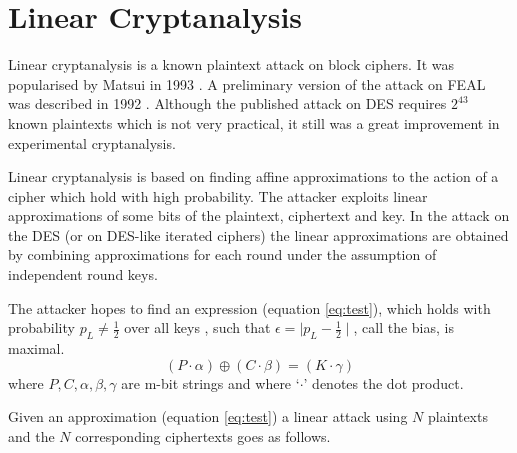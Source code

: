 \section{Linear Cryptanalysis}
Linear cryptanalysis is a known plaintext attack on block ciphers. It was popularised by Matsui in 1993 \cite{matsui1994linear}. A preliminary version of the attack on FEAL was described in 1992 \cite{matsui1993new}. Although the published attack on DES requires $2^{43}$ known plaintexts which is not very practical, it still was a great improvement in experimental cryptanalysis. 

Linear cryptanalysis is based on finding affine approximations to the action of a cipher which hold with high probability. The attacker exploits linear approximations of some bits of the plaintext, ciphertext and key. In the attack on the DES (or on DES-like iterated ciphers) the linear approximations are obtained by combining approximations for each round under the assumption of independent round keys. 

The attacker hopes to find an expression (equation \ref{eq:test}), which holds with probability $p_{L} \neq \frac{1}{2}$ over all keys \cite{matsui1994linear}, such that $\epsilon = \mid p_{L} - \frac{1}{2} \mid$, call the bias, is maximal. 
\begin{equation} \label{eq:test}
(P\cdot\alpha)\oplus(C\cdot\beta)=(K\cdot\gamma)
\end{equation}
where $P,C,\alpha,\beta,\gamma$ are m-bit strings and where `$\cdot$' denotes the dot product.

Given an approximation (equation \ref{eq:test}) a linear attack using $N$ plaintexts and the $N$ corresponding ciphertexts goes as follows\cite{matsui1994linear}. 

